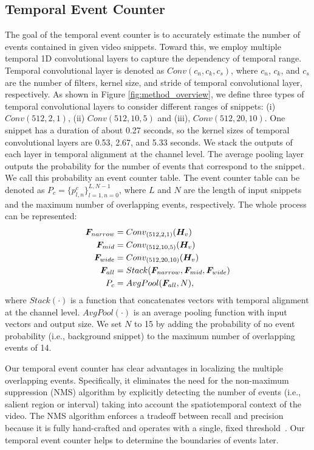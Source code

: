 \subsection{Temporal Event Counter}
\label{subsec:method_temporal_event_counter}
The goal of the temporal event counter is to accurately estimate the number of events contained in given video snippets.
Toward this, we employ multiple temporal 1D convolutional layers to capture the dependency of temporal range.
Temporal convolutional layer is denoted as $Conv(c_n, c_k, c_s)$, where $c_n$, $c_k$, and $c_s$ are the number of filters, kernel size, and stride of temporal convolutional layer, respectively.
As shown in Figure \ref{fig:method_overview}, we define three types of temporal convolutional layers to consider different ranges of snippets: (i) $Conv(512, 2, 1)$, (ii) $Conv(512, 10, 5)$ and (iii), $Conv(512, 20, 10)$.
One snippet has a duration of about 0.27 seconds, so the kernel sizes of temporal convolutional layers are 0.53, 2.67, and 5.33 seconds.
We stack the outputs of each layer in temporal alignment at the channel level.
The average pooling layer outputs the probability for the number of events that correspond to the snippet.
We call this probability an event counter table.
The event counter table can be denoted as $P_c = \{p_{l,n}^c\}_{l=1,n=0}^{L, N-1}$, where $L$ and $N$ are the length of input snippets and the maximum number of overlapping events, respectively.
The whole process can be represented:
\begin{align}
  \bm{F}_{narrow} & = Conv_{(512, 2, 1)} (\bm{H}_v)                               \\
  \bm{F}_{mid}    & = Conv_{(512, 10, 5)} (\bm{H}_v)                              \\
  \bm{F}_{wide}   & = Conv_{(512, 20, 10)} (\bm{H}_v)                             \\
  \bm{F}_{all}    & = Stack(\bm{F}_{narrow}, \bm{F}_{mid}, \bm{F}_{wide}) \\
  P_c                 & = AvgPool(\bm{F}_{all}, N),
\end{align}
where $Stack(\cdot)$ is a function that concatenates vectors with temporal alignment at the channel level.
$AvgPool(\cdot)$ is an average pooling function with input vectors and output size.
We set $N$ to 15 by adding the probability of no event probability (i.e., background snippet) to the maximum number of overlapping events of 14.

Our temporal event counter has clear advantages in localizing the multiple overlapping events.
Specifically, it eliminates the need for the non-maximum suppression (NMS) algorithm by explicitly detecting the number of events (i.e., salient region or interval) taking into account the spatiotemporal context of the video.
The NMS algorithm enforces a tradeoff between recall and precision because it is fully hand-crafted and operates with a single, fixed threshold~\cite{hosang2017learning}.
Our temporal event counter helps to determine the boundaries of events later.

